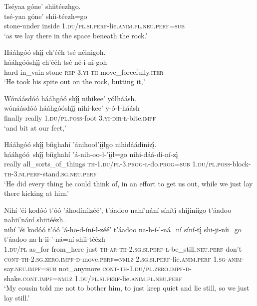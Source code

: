 \ea\label{ex:text6-8-19}
Tséyaa góne’ shiitéezhgo.\\
\gll tsé-yaa	góne’	shii-téezh=go\\
     stone-under	inside	1.\textsc{du}/\textsc{pl}.\textsc{si}.\textsc{perf}-lie.\textsc{anim}.\textsc{pl}.\textsc{neu}.\textsc{perf}=\textsc{sub}\\
\glt `as we lay there in the space beneath the rock.'
\z

\ea\label{ex:text6-8-20}
Hááhgóó shį́į́ ch’ééh tsé néinigoh.\\
\gll hááhgóóshį́į́	ch’ééh	tsé	né-i-ni-goh\\
     hard	in\_vain	stone	\textsc{rep}-3.\textsc{yi}-\textsc{th}-move\_forcefully.\textsc{iter}\\
\glt `He took his spite out on the rock, butting it,'
\z

\newpage
\ea\label{ex:text6-8-21}
Wónáásdóó hááhgóó shį́į́ nihikee’ yółháásh.\\
\gll wónáásdóó	hááhgóóshį́į́	nihi-kee’	y-ó-ł-háásh\\
     finally	really	1.\textsc{du}/\textsc{pl}.\textsc{poss}-foot	3.\textsc{yi}-\textsc{dir}-\textsc{ł}-bite.\textsc{impf}\\
\glt `and bit at our feet,'
\z

\ea\label{ex:text6-8-22}
Hááhgóó shį́į́ bíighahí ’ánihooł’įįłgo nihidáádinízį́.\\
\gll hááhgóó~{shį́į́}	bíighahí	’á-nih-oo-ł-’įįł=go	nihi-dáá-di-ní-zį́\\
     really	all\_sorts\_of\_things	\textsc{th}-1.\textsc{du}/\textsc{pl}-3.\textsc{prog}-\textsc{ł}-do.\textsc{prog}=\textsc{sub}	1.\textsc{du}/\textsc{pl}.\textsc{poss}-block-\textsc{th}-3.\textsc{ni}.\textsc{perf}-stand.\textsc{sg}.\textsc{neu}.\textsc{perf}\\
\glt `He did every thing he could think of, in an effort to get us out, while we just lay there kicking at him.'
\z

\ea\label{ex:text6-8-23}
Nihí ’éi kodóó t’óó ’áhodínílzéé’, t’áadoo nahí’nání sínítį́ shijiníigo t’áadoo nahii’nání shiitéézh.\\
\gll nihí	’éi	kodóó	t’óó	’á-ho-d-íní-l-zéé’	t’áadoo	na-h-í-’-ná=ní	síní-tį́	shi-ji-níi=go	t’áadoo	na-h-ii-’-ná=ní	shii-téézh\\
     1.\textsc{du}/\textsc{pl}	as\_for	from\_here	just	\textsc{th}-\textsc{ar}-\textsc{th}-2.\textsc{sg}.\textsc{si}.\textsc{perf}-\textsc{l}-be\_still.\textsc{neu}.\textsc{perf}	don’t	\textsc{cont}-\textsc{th}-2.\textsc{sg}.\textsc{zero}.\textsc{impf}-\textsc{d}-move.\textsc{perf}=\textsc{nmlz}	2.\textsc{sg}.\textsc{si}.\textsc{perf}-lie.\textsc{anim}.\textsc{perf}	1.\textsc{sg}-\textsc{anim}-say.\textsc{neu}.\textsc{impf}=\textsc{sub}	not\_anymore	\textsc{cont}-\textsc{th}-1.\textsc{du}/\textsc{pl}.\textsc{zero}.\textsc{impf}-\textsc{d}-shake.\textsc{cont}.\textsc{impf}=\textsc{nmlz}	1.\textsc{du}/\textsc{pl}.\textsc{si}.\textsc{perf}-lie.\textsc{anim}.\textsc{pl}.\textsc{neu}.\textsc{perf}\\
\glt `My cousin told me not to bother him, to just keep quiet and lie still, so we just lay still.'
\z

